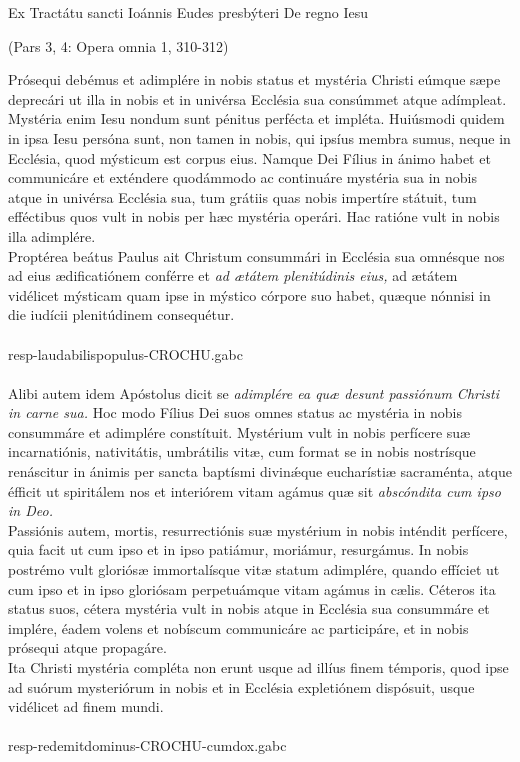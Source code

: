 \documentclass[options]{article}
\begin{document}
	Ex Tractátu sancti Ioánnis Eudes presbýteri De regno Iesu
	\begin{flushright}
		(Pars 3, 4: Opera omnia 1, 310-312)
	\end{flushright}
Prósequi debémus et adimplére in nobis status et mystéria Christi eúmque sæpe deprecári ut illa in nobis et in univérsa Ecclésia sua consúmmet atque adímpleat.\\ 
Mystéria enim Iesu nondum sunt pénitus perfécta et impléta. Huiúsmodi quidem in ipsa Iesu persóna sunt, non tamen in nobis, qui ipsíus membra sumus, neque in Ecclésia, quod mýsticum est corpus eius. Namque Dei Fílius in ánimo habet et communicáre et exténdere quodámmodo ac continuáre mystéria sua in nobis atque in univérsa Ecclésia sua, tum grátiis quas nobis impertíre státuit, tum efféctibus quos vult in nobis per hæc mystéria operári. Hac ratióne vult in nobis illa adimplére.\\ 
Proptérea beátus Paulus ait Christum consummári in Ecclésia sua omnésque nos ad eius ædificatiónem conférre et \emph{ad ætátem plenitúdinis eius,} ad ætátem vidélicet mýsticam quam ipse in mýstico córpore suo habet, quæque nónnisi in die iudícii plenitúdinem consequétur. \\
\\
resp-laudabilispopulus-CROCHU.gabc
\\\\
Alibi autem idem Apóstolus dicit se \emph{adimplére ea quæ desunt passiónum Christi in carne sua.} Hoc modo Fílius Dei suos omnes status ac mystéria in nobis consummáre et adimplére constítuit. Mystérium vult in nobis perfícere suæ incarnatiónis, nativitátis, umbrátilis vitæ, cum format se in nobis nostrísque renáscitur in ánimis per sancta baptísmi divin\'{æ}que eucharístiæ sacraménta, atque éfficit ut spiritálem nos et interiórem vitam agámus quæ sit \emph{abscóndita cum ipso in Deo.}\\
Passiónis autem, mortis, resurrectiónis suæ mystérium in nobis inténdit perfícere, quia facit ut cum ipso et in ipso patiámur, moriámur, resurgámus. In nobis postrémo vult gloriósæ immortalísque vitæ statum adimplére, quando effíciet ut cum ipso et in ipso gloriósam perpetuámque vitam agámus in cælis. Céteros ita status suos, cétera mystéria vult in nobis atque in Ecclésia sua consummáre et implére, éadem volens et nobíscum communicáre ac participáre, et in nobis prósequi atque propagáre.\\ 
Ita Christi mystéria compléta non erunt usque ad illíus finem témporis, quod ipse ad suórum mysteriórum in nobis et in Ecclésia expletiónem dispósuit, usque vidélicet ad finem mundi.
\\\\

resp-redemitdominus-CROCHU-cumdox.gabc
\end{document}
